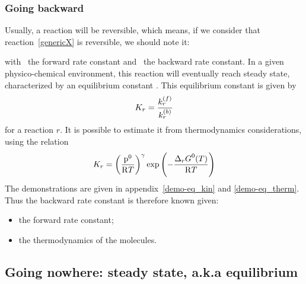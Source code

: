 \subsubsection{Going backward}

Usually, a reaction will be reversible, which means, if we consider
that reaction~\ref{genericX} is reversible, we should note it:
\begin{chemicalEquation}
\label{genericXrev}
\end{chemicalEquation}
with \fwdratecons\ the forward rate constant and \bkwdratecons\ the backward rate constant.
In a given physico-chemical environment, this reaction will eventually reach
steady state, characterized by an equilibrium constant \Eqconst. 
This equilibrium constant is given by
\begin{equation}
\Eqconst[r] = \frac{\fwdratecons[r]}{\bkwdratecons[r]}
\label{therm:K_kin}
\end{equation}
for a reaction $r$.
It is possible to estimate it from thermodynamics considerations, 
using the relation
\begin{equation}
\Eqconst[r] = \left(\frac{\pz}{\Rg \Temp}\right)^\gamma \exp\left(-\frac{\DGibbsZ[r](\Temp)}{\Rg \Temp}\right)
\label{therm:K_therm}
\end{equation}
The demonstrations are given in appendix~\ref{demo-eq_kin} and \ref{demo-eq_therm}. 
Thus the backward rate constant is therefore known given:
\begin{itemize}
\item the forward rate constant;
\item the thermodynamics of the molecules.
\end{itemize}

\subsection{Going nowhere: steady state, a.k.a equilibrium}
\label{phys:equilibrium}

